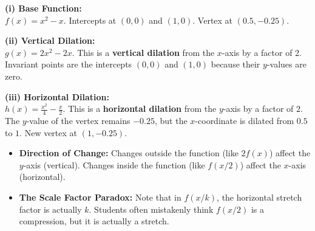 \begin{solution}
\textbf{(i) Base Function:} \\
$f(x) = x^2 - x$. Intercepts at $(0, 0)$ and $(1, 0)$. Vertex at $(0.5, -0.25)$.

\textbf{(ii) Vertical Dilation:} \\
$g(x) = 2x^2 - 2x$. This is a \textbf{vertical dilation} from the $x$-axis by a factor of 2. 
Invariant points are the intercepts $(0, 0)$ and $(1, 0)$ because their $y$-values are zero.

\textbf{(iii) Horizontal Dilation:} \\
$h(x) = \frac{x^2}{4} - \frac{x}{2}$. This is a \textbf{horizontal dilation} from the $y$-axis by a factor of $2$. 
The $y$-value of the vertex remains $-0.25$, but the $x$-coordinate is dilated from $0.5$ to $1$. New vertex at $(1, -0.25)$.
\end{solution}

\begin{takeaways}
\begin{itemize}[leftmargin=*]
\item \textbf{Direction of Change:} Changes outside the function (like $2f(x)$) affect the $y$-axis (vertical). Changes inside the function (like $f(x/2)$) affect the $x$-axis (horizontal).
\item \textbf{The Scale Factor Paradox:} Note that in $f(x/k)$, the horizontal stretch factor is actually $k$. Students often mistakenly think $f(x/2)$ is a compression, but it is actually a stretch.
\end{itemize}
\end{takeaways}
